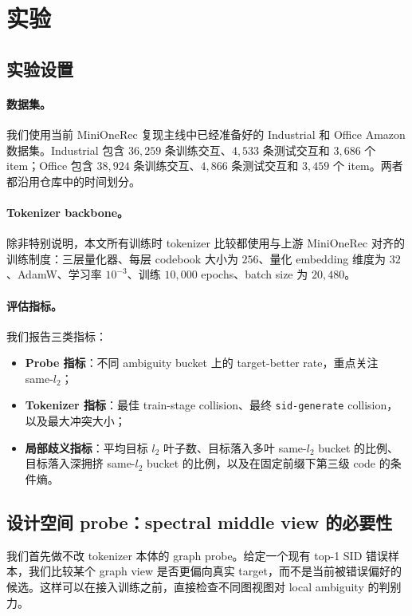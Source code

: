 \section{实验}
\label{sec:experiments}

\subsection{实验设置}

\paragraph{数据集。}
我们使用当前 MiniOneRec 复现主线中已经准备好的 Industrial 和 Office Amazon 数据集。Industrial 包含 $36{,}259$ 条训练交互、$4{,}533$ 条测试交互和 $3{,}686$ 个 item；Office 包含 $38{,}924$ 条训练交互、$4{,}866$ 条测试交互和 $3{,}459$ 个 item。两者都沿用仓库中的时间划分。

\paragraph{Tokenizer backbone。}
除非特别说明，本文所有训练时 tokenizer 比较都使用与上游 MiniOneRec 对齐的 \rqvae{} 训练制度：三层量化器、每层 codebook 大小为 $256$、量化 embedding 维度为 $32$、AdamW、学习率 $10^{-3}$、训练 $10{,}000$ epochs、batch size 为 $20{,}480$。

\paragraph{评估指标。}
我们报告三类指标：
\begin{itemize}[leftmargin=1.4em]
  \item \textbf{Probe 指标}：不同 ambiguity bucket 上的 target-better rate，重点关注 same-$l_2$；
  \item \textbf{Tokenizer 指标}：最佳 train-stage collision、最终 \texttt{sid-generate} collision，以及最大冲突大小；
  \item \textbf{局部歧义指标}：平均目标 $l_2$ 叶子数、目标落入多叶 same-$l_2$ bucket 的比例、目标落入深拥挤 same-$l_2$ bucket 的比例，以及在固定前缀下第三级 code 的条件熵。
\end{itemize}

\subsection{设计空间 probe：spectral middle view 的必要性}

我们首先做不改 tokenizer 本体的 graph probe。给定一个现有 top-1 SID 错误样本，我们比较某个 graph view 是否更偏向真实 target，而不是当前被错误偏好的候选。这样可以在接入训练之前，直接检查不同图视图对 local ambiguity 的判别力。

